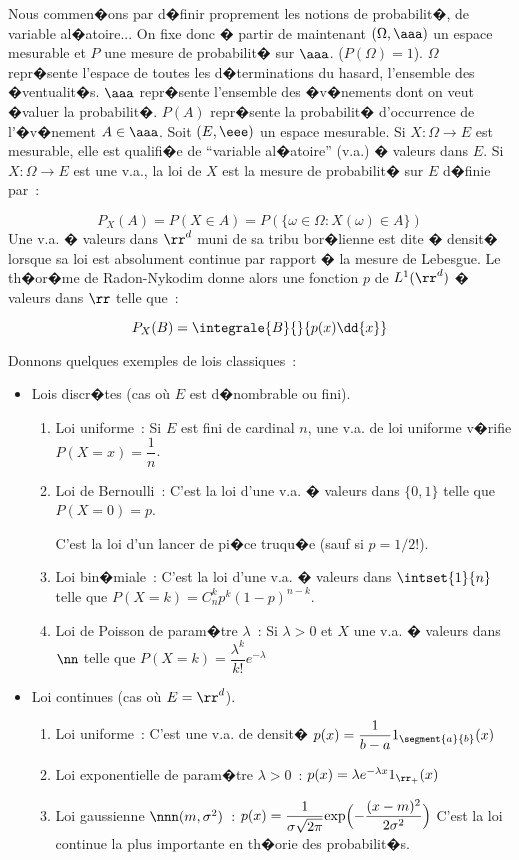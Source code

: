 Nous commen�ons par d�finir proprement les notions de probabilit�, de variable al�atoire... On fixe donc � partir de maintenant 
$(\Omega,\aaa)$ un espace mesurable et $P$ une mesure de probabilit� sur $\aaa$. ($P(\Omega) = 1$). $\Omega$ repr�sente l'espace de 
toutes les d�terminations du hasard, l'ensemble des �ventualit�s. $\aaa$ repr�sente l'ensemble des �v�nements dont on veut �valuer la 
probabilit�. $P(A)$ repr�sente la probabilit� d'occurrence de l'�v�nement $A\in \aaa$. 
 Soit $(E,\eee)$ un espace mesurable. Si $X : \Omega\to E$ est mesurable, elle est qualifi�e de 
``variable al�atoire'' (v.a.) � valeurs dans $E$. 
 Si $X : \Omega\to E$ est une v.a., la loi de $X$ est la mesure de probabilit� sur $E$ d�finie par~:\par
$$P_X(A) = P(X\in A) = P(\lbrace\omega\in \Omega : X(\omega)\in A\rbrace)$$
 Une v.a. � valeurs dans ${\rr}^d$ muni de sa tribu bor�lienne est dite � densit� lorsque sa loi est absolument
continue par rapport � la mesure de Lebesgue. Le th�or�me de Radon-Nykodim donne alors une fonction $p$ de $L^1({\rr}^d)$ � valeurs 
dans $\rr$ telle que~:\par
$$P_X(B) = \integrale{B}{}{p(x)\dd{x}}$$\par
Donnons quelques exemples de lois classiques~:
\begin{itemize}
\item{Lois discr�tes (cas o\`u $E$ est d�nombrable ou fini).}
\begin{enumerate}
\item{Loi uniforme~:} Si $E$ est fini de cardinal $n$, une v.a. de loi uniforme v�rifie $P(X=x) = \dfrac{1}{n}$.
\item{Loi de Bernoulli~:} C'est la loi d'une v.a. � valeurs dans $\lbrace 0,1\rbrace$ telle que $P(X=0) = p$.\par
C'est la loi d'un lancer de pi�ce truqu�e (sauf si $p = 1/2$!).
\item{Loi bin�miale~:} C'est la loi d'une v.a. � valeurs dans $\intset{1}{n}$ telle que $P(X=k) = C^k_np^k(1-p)^{n-k}$.
\item{Loi de Poisson de param�tre $\lambda$~:} Si $\lambda > 0$ et $X$ une v.a. � valeurs dans $\nn$ telle que 
$P(X=k) = \dfrac{\lambda^k}{k!}e^{-\lambda}$
\end{enumerate}
\item{Loi continues (cas o\`u $E = {\rr}^d$).}
\begin{enumerate}
\item{Loi uniforme~:} C'est une v.a. de densit� $p(x) = \dfrac{1}{b-a}1_{\segment{a}{b}}(x)$
\item{Loi exponentielle de param�tre $\lambda>0$~:} $p(x) = \lambda e^{-\lambda x}1_{{\rr}_+}(x)$
\item{Loi gaussienne $\nnn(m,\sigma^2)$~:} $p(x) = \dfrac{1}{\sigma\sqrt{2\pi}}\mathrm{exp}\Bigl(-\dfrac{(x-m)^2}{2\sigma^2}\Bigr)$
C'est la loi continue la plus importante en th�orie des probabilit�s.
\end{enumerate}
\end{itemize}
